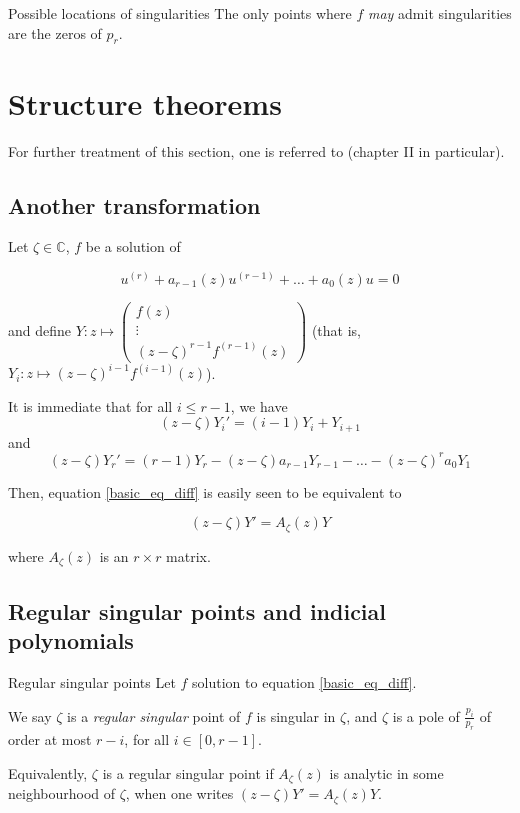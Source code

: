 \documentclass[../main.tex]{subfiles}
\begin{document}
\begin{cor}{Possible locations of singularities}\label{cor_sing_location}
	The only points where $f$ \emph{may} admit singularities are the zeros of $p_r$.
\end{cor}


\section{Structure theorems}

For further treatment of this section, one is referred to \cite{Wasow1965} (chapter II in particular).

\subsection{Another transformation}

Let $\zeta \in \mathbb{C}$, $f$ be a solution of

\begin{equation*}
	u^{(r)} + a_{r - 1}(z) u^{(r - 1)} + \dots + a_0(z) u = 0
\end{equation*}

and define $Y : z \mapsto \begin{pmatrix}
f(z)\\
\vdots \\
{(z - \zeta)}^{r - 1} f^{(r - 1)}(z)
\end{pmatrix}$ (that is, $Y_i : z \mapsto {(z - \zeta)}^{i - 1} f^{(i - 1)}(z)$).

It is immediate that for all $i \leq r - 1$, we have $${(z - \zeta)} Y_i' = (i-1)Y_i + Y_{i + 1}$$ and
$$ {(z - \zeta)} Y	_r' = (r - 1)Y_r - {(z - \zeta)} a_{r-1} Y_{r - 1} - \dots - {(z - \zeta)}^r a_0 Y_1 $$

Then, equation \eqref{basic_eq_diff} is easily seen to be equivalent to

\begin{equation}\label{eq_diff_matrix_form}
{(z - \zeta)}Y' = A_\zeta(z)Y
\end{equation}

where $A_\zeta(z)$ is an $r \times r$ matrix.

\subsection{Regular singular points and indicial polynomials}


\begin{definition}{Regular singular points}
	Let $f$ solution to equation \eqref{basic_eq_diff}.
	
	We say $\zeta$ is a \emph{regular singular} point of $f$ is singular in $\zeta$, and $\zeta$ is a pole of $\frac{p_i}{p_r}$ of order at most $r - i$, for all $i \in [0, r - 1]$.
	
	Equivalently, $\zeta$ is a regular singular point if $A_\zeta(z)$ is analytic in some neighbourhood of $\zeta$, when one writes $(z - \zeta)Y' = A_\zeta(z) Y$.
\end{definition}
\end{document}
